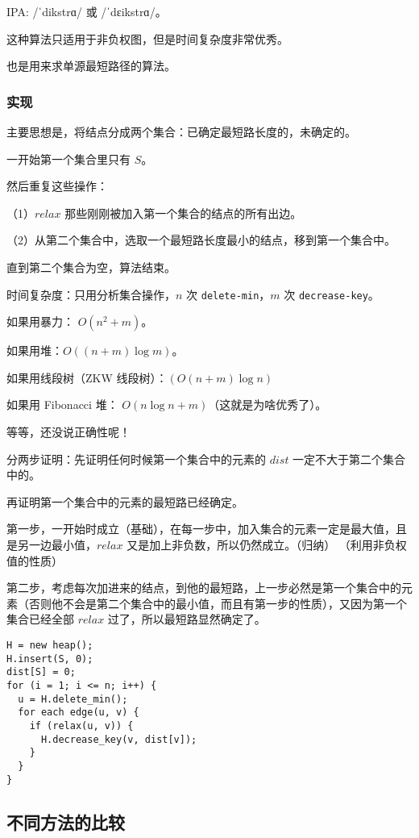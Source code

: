 IPA: /ˈdikstrɑ/ 或 /ˈdɛikstrɑ/。

这种算法只适用于非负权图，但是时间复杂度非常优秀。

也是用来求单源最短路径的算法。

\subsubsection{实现}

主要思想是，将结点分成两个集合：已确定最短路长度的，未确定的。

一开始第一个集合里只有 $S$。

然后重复这些操作：

（1）$relax$ 那些刚刚被加入第一个集合的结点的所有出边。

（2）从第二个集合中，选取一个最短路长度最小的结点，移到第一个集合中。

直到第二个集合为空，算法结束。

时间复杂度：只用分析集合操作，$n$ 次 \texttt{delete-min}，$m$ 次 \texttt{decrease-key}。

如果用暴力： $O(n^2 + m)$。

如果用堆：$O((n+m) \log m)$。

如果用线段树（ZKW 线段树）：$(O(n+m)\log n)$

如果用 Fibonacci 堆： $O(n \log n + m)$（这就是为啥优秀了）。

等等，还没说正确性呢！

分两步证明：先证明任何时候第一个集合中的元素的 $dist$ 一定不大于第二个集合中的。

再证明第一个集合中的元素的最短路已经确定。

第一步，一开始时成立（基础），在每一步中，加入集合的元素一定是最大值，且是另一边最小值，$relax$ 又是加上非负数，所以仍然成立。（归纳） （利用非负权值的性质）

第二步，考虑每次加进来的结点，到他的最短路，上一步必然是第一个集合中的元素（否则他不会是第二个集合中的最小值，而且有第一步的性质），又因为第一个集合已经全部 $relax$ 过了，所以最短路显然确定了。

\begin{verbatim}
H = new heap();
H.insert(S, 0);
dist[S] = 0;
for (i = 1; i <= n; i++) {
  u = H.delete_min();
  for each edge(u, v) {
    if (relax(u, v)) {
      H.decrease_key(v, dist[v]);
    }
  }
}
\end{verbatim}

\hr

\subsection{不同方法的比较}

